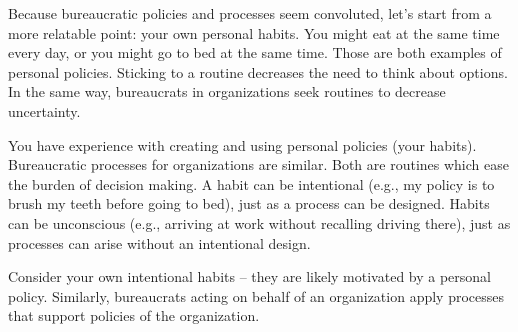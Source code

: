 
Because bureaucratic policies and processes seem convoluted, let's start from a more relatable point: your own personal habits.
You might eat at the same time every day, or you might go to bed at the same time. Those are both examples of personal policies. Sticking to a routine decreases the need to think about options. In the same way, bureaucrats in organizations seek routines to decrease uncertainty. 

You have experience with creating and using personal policies (your habits).  Bureaucratic processes for organizations are similar.
Both are routines which ease the burden of decision making. A habit can be intentional (e.g., my policy is to brush my teeth before going to bed), just as a process can be designed. Habits can be unconscious (e.g., arriving at work without recalling driving there), just as processes can arise without an intentional design. 

Consider your own intentional habits -- they are likely motivated by a personal policy. Similarly, bureaucrats acting on behalf of an organization apply processes that support policies of the organization.

